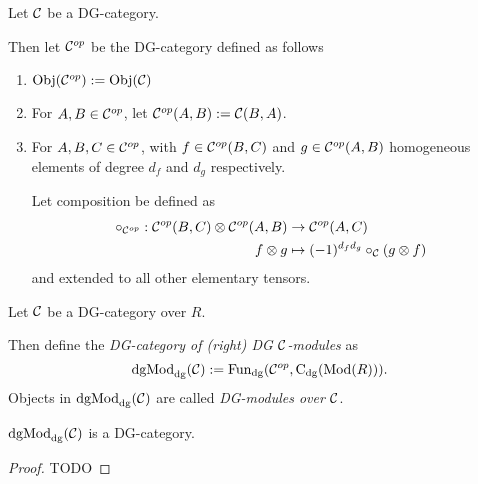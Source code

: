 \begin{definition}
    Let \( {\mathcal{C}} \) be a DG-category.

    Then let \( {\mathcal{C}}^{op} \) be the DG-category defined as follows
    \begin{enumerate}
        \item {
            \( \operatorname{Obj}({\mathcal{C}}^{op}) := \operatorname{Obj}({\mathcal{C}}) \)
        }
        \item {
            For \( A, B \in {\mathcal{C}}^{op} \), let \( {\mathcal{C}}^{op}(A, B) := {\mathcal{C}}(B, A) \).
        }
        \item {
            For \( A, B, C \in {\mathcal{C}}^{op} \), with \( f \in {\mathcal{C}}^{op}(B, C) \) and \( g \in {\mathcal{C}}^{op}(A, B) \) homogeneous elements of degree \( d_f \) and \( d_g \) respectively.

            Let composition be defined as
            \begin{align*}
                \circ_{{\mathcal{C}}^{op}}: {\mathcal{C}}^{op}(B, C) \otimes {\mathcal{C}}^{op}(A, B) &\to {\mathcal{C}}^{op}(A, C) \\
                f \otimes g &\mapsto (-1)^{d_f d_g} \circ_{{\mathcal{C}}} (g \otimes f)
            \end{align*}
            and extended to all other elementary tensors.
        }
    \end{enumerate}
\end{definition}

\begin{definition}[\( \dgMod_{\dg}(\Cc) \)]
    Let \( {\mathcal{C}} \) be a DG-category over \( R \).

    Then define the \emph{DG-category of (right) DG \( {\mathcal{C}} \)-modules} as
    \[
        \operatorname{dgMod}_{\operatorname{dg}}({\mathcal{C}}) := \operatorname{Fun}_{\operatorname{dg}}({\mathcal{C}}^{op}, \operatorname{C}_{\operatorname{dg}}(\operatorname{Mod}(R))).
    \]
    Objects in \( \dgMod_{\dg}(\Cc) \) are called \emph{DG-modules over \( {\mathcal{C}} \)}.
\end{definition}

\begin{proposition}
    \( \dgMod_{\dg}(\Cc) \) is a DG-category.
\end{proposition}
\begin{proof}
    TODO
\end{proof}

